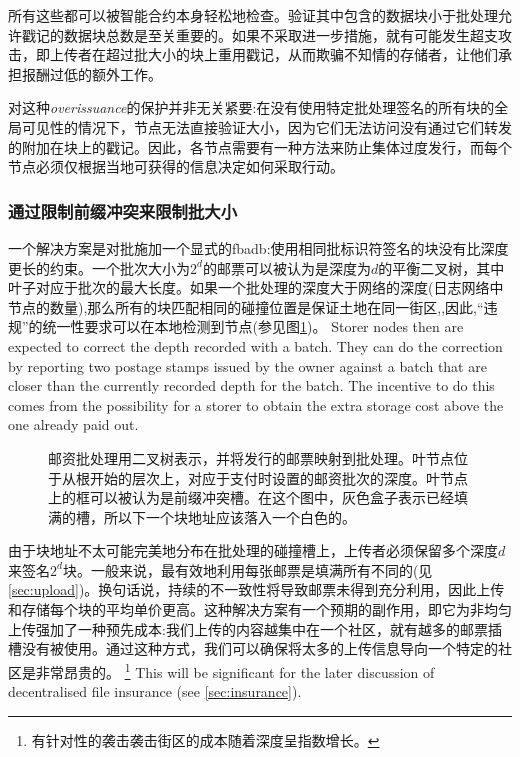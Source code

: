 所有这些都可以被智能合约本身轻松地检查。验证其中包含的数据块小于批处理允许戳记的数据块总数是至关重要的。如果不采取进一步措施，就有可能发生超支攻击，即上传者在超过批大小的块上重用戳记，从而欺骗不知情的存储者，让他们承担报酬过低的额外工作。

对这种\emph{overissuance}的保护并非无关紧要:在没有使用特定批处理签名的所有块的全局可见性的情况下，节点无法直接验证大小，因为它们无法访问没有通过它们转发的附加在块上的戳记。因此，各节点需要有一种方法来防止集体过度发行，而每个节点必须仅根据当地可获得的信息决定如何采取行动。

\subsubsection{通过限制前缀冲突来限制批大小}

一个解决方案是对批施加一个显式的fbadb:使用相同批标识符签名的块没有比深度更长的约束。一个批次大小为$2^d$的邮票可以被认为是深度为$d$的平衡二叉树，其中叶子对应于批次的最大长度。如果一个批处理的深度大于网络的深度(日志网络中节点的数量),那么所有的块匹配相同的碰撞位置是保证土地在同一街区,,因此,“违规”的统一性要求可以在本地检测到节点(参见图\ref{fig:prefix-collision})。 
Storer nodes then are expected to  correct the depth recorded with a batch.
They can do the correction by reporting two postage stamps issued by the owner against a batch that are closer than the currently recorded depth for the batch.
The incentive to do this comes from the possibility for a storer to obtain the extra storage cost above the one already paid out.


\begin{figure}[htbp]
  \centering
   \caption[限制邮票大小\statusgreen]{邮资批处理用二叉树表示，并将发行的邮票映射到批处理。叶节点位于从根开始的层次上，对应于支付时设置的邮资批次的深度。叶节点上的框可以被认为是前缀冲突槽。在这个图中，灰色盒子表示已经填满的槽，所以下一个块地址应该落入一个白色的。}
  \label{fig:prefix-collision}
\end{figure}


由于块地址不太可能完美地分布在批处理的碰撞槽上，上传者必须保留多个深度$d$来签名$2^d$块。一般来说，最有效地利用每张邮票是填满所有不同的(见\ref{sec:upload})。换句话说，持续的不一致性将导致邮票未得到充分利用，因此上传和存储每个块的平均单价更高。这种解决方案有一个预期的副作用，即它为非均匀上传强加了一种预先成本:我们上传的内容越集中在一个社区，就有越多的邮票插槽没有被使用。通过这种方式，我们可以确保将太多的上传信息导向一个特定的社区是非常昂贵的。%
%
\footnote{有针对性的袭击袭击街区的成本随着深度呈指数增长。}
%
This will be significant for the later discussion of decentralised file insurance (see \ref{sec:insurance}). 

